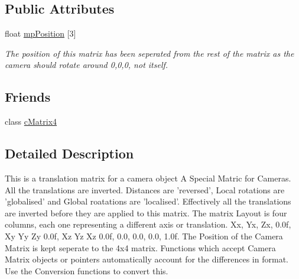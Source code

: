 \subsection*{Public Attributes}
\begin{DoxyCompactItemize}
\item 
\hypertarget{classc_camera_matrix4_afb48ac51e480abcece16e031d8bc300a}{
float \hyperlink{classc_camera_matrix4_afb48ac51e480abcece16e031d8bc300a}{mpPosition} \mbox{[}3\mbox{]}}
\label{classc_camera_matrix4_afb48ac51e480abcece16e031d8bc300a}

\begin{DoxyCompactList}\small\item\em The position of this matrix has been seperated from the rest of the matrix as the camera should rotate around 0,0,0, not itself. \end{DoxyCompactList}\end{DoxyCompactItemize}
\subsection*{Friends}
\begin{DoxyCompactItemize}
\item 
\hypertarget{classc_camera_matrix4_a9fe15ae517530a4ef2b8001131c522e3}{
class \hyperlink{classc_camera_matrix4_a9fe15ae517530a4ef2b8001131c522e3}{cMatrix4}}
\label{classc_camera_matrix4_a9fe15ae517530a4ef2b8001131c522e3}

\end{DoxyCompactItemize}


\subsection{Detailed Description}
This is a translation matrix for a camera object A Special Matric for Cameras. All the translations are inverted. Distances are 'reversed', Local rotations are 'globalised' and Global roatations are 'localised'. Effectively all the translations are inverted before they are applied to this matrix. The matrix Layout is four columns, each one representing a different axis or translation. Xx, Yx, Zx, 0.0f, Xy Yy Zy 0.0f, Xz Yz Xz 0.0f, 0.0, 0.0, 0.0, 1.0f. The Position of the Camera Matrix is kept seperate to the 4x4 matrix. Functions which accept Camera Matrix objects or pointers automatically account for the differences in format. Use the Conversion functions to convert this. 